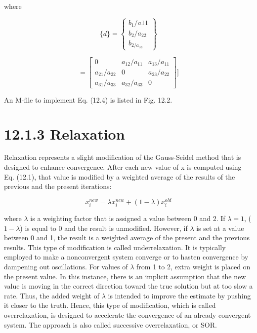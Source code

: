 \documentclass[../main.tex]{subfiles}
\begin{document}
where

\begin{equation}
\{d\}=\begin{Bmatrix}
b_{1}/a{11}\\
b_{2}/a_{22}\\
b_{2/a_{33}}
\end{Bmatrix}
\end{equation}


\begin{equation}
[C]=\begin{bmatrix}
0 &a_{12}/a_{11}  &a_{13}/a_{11} \\
 a_{21} / a_{22}& 0 & a_{23} /a_{22}\\
a_{31}/a_{33} & a_{32}/a_{33} & 0
\end{bmatrix}]
\end{equation}

An M-file to implement Eq. (12.4) is listed in Fig. 12.2.

\section*{12.1.3 Relaxation}

Relaxation represents a slight modification of the Gauss-Seidel method that is designed to
enhance convergence. After each new value of x is computed using Eq. (12.1), that value is
modified by a weighted average of the results of the previous and the present iterations:

\begin{equation}
x_{i}^{new}=\lambda x_{i}^{new} + (1 - \lambda)x_{i}^{old}
\end{equation}

where $\lambda$ is a weighting factor that is assigned a value between 0 and 2.
If $\lambda=1$, ($1-\lambda$) is equal to 0 and the result is unmodified. However, if $\lambda$ is set at a
value between 0 and 1, the result is a weighted average of the present and the previous results. This type of modification is called underrelaxation. It is typically employed to make
a nonconvergent system converge or to hasten convergence by dampening out oscillations.
For values of $\lambda$ from 1 to 2, extra weight is placed on the present value. In this instance, there is an implicit assumption that the new value is moving in the correct direction
toward the true solution but at too slow a rate. Thus, the added weight of $\lambda$ is intended to
improve the estimate by pushing it closer to the truth. Hence, this type of modification,
which is called overrelaxation, is designed to accelerate the convergence of an already convergent system. The approach is also called successive overrelaxation, or SOR.
\end{document}
